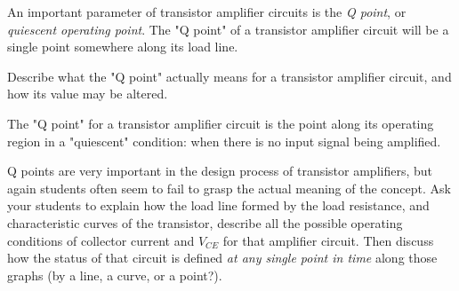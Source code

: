 

An important parameter of transistor amplifier circuits is the {\it Q point}, or {\it quiescent operating point}.  The "Q point" of a transistor amplifier circuit will be a single point somewhere along its load line.

Describe what the "Q point" actually means for a transistor amplifier circuit, and how its value may be altered.







The "Q point" for a transistor amplifier circuit is the point along its operating region in a "quiescent" condition: when there is no input signal being amplified.







Q points are very important in the design process of transistor amplifiers, but again students often seem to fail to grasp the actual meaning of the concept.  Ask your students to explain how the load line formed by the load resistance, and characteristic curves of the transistor, describe all the possible operating conditions of collector current and $V_{CE}$ for that amplifier circuit.  Then discuss how the status of that circuit is defined {\it at any single point in time} along those graphs (by a line, a curve, or a point?).




